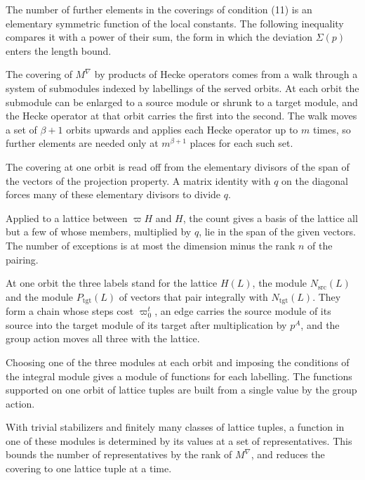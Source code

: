 The number of further elements in the coverings of condition (11) is an elementary symmetric function
of the local constants. The following inequality compares it with a power of their sum, the form in
which the deviation $\Sigma(p)$ enters the length bound.

The covering of $M^\nabla$ by products of Hecke operators comes from a walk through a system of
submodules indexed by labellings of the served orbits. At each orbit the submodule can be enlarged to
a source module or shrunk to a target module, and the Hecke operator at that orbit carries the first
into the second. The walk moves a set of $\beta+1$ orbits upwards and applies each Hecke operator up
to $m$ times, so further elements are needed only at $m^{\beta+1}$ places for each such set.

The covering at one orbit is read off from the elementary divisors of the span of the vectors of the
projection property. A matrix identity with $q$ on the diagonal forces many of these elementary
divisors to divide $q$.

Applied to a lattice between $\varpi H$ and $H$, the count gives a basis of the lattice all but a few
of whose members, multiplied by $q$, lie in the span of the given vectors. The number of exceptions is
at most the dimension minus the rank $n$ of the pairing.

At one orbit the three labels stand for the lattice $H(L)$, the module $N_{\mathrm{src}}(L)$ and the
module $P_{\mathrm{tgt}}(L)$ of vectors that pair integrally with $N_{\mathrm{tgt}}(L)$. They form a
chain whose steps cost $\varpi_0^t$, an edge carries the source module of its source into the target
module of its target after multiplication by $p^A$, and the group action moves all three with the
lattice.

Choosing one of the three modules at each orbit and imposing the conditions of the integral module
gives a module of functions for each labelling. The functions supported on one orbit of lattice
tuples are built from a single value by the group action.

With trivial stabilizers and finitely many classes of lattice tuples, a function in one of these
modules is determined by its values at a set of representatives. This bounds the number of
representatives by the rank of $M^\nabla$, and reduces the covering to one lattice tuple at a time.

